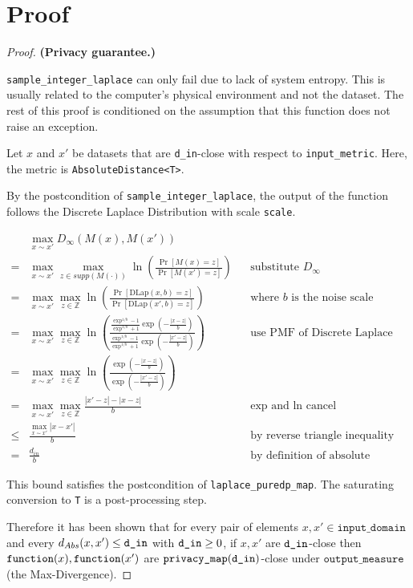 \documentclass{article}
\begin{document}

\section{Proof}

\begin{proof} 
\textbf{(Privacy guarantee.)} 

\texttt{sample\_integer\_laplace} can only fail due to lack of system entropy. 
This is usually related to the computer's physical environment and not the dataset. 
The rest of this proof is conditioned on the assumption that this function does not raise an exception. 

Let $x$ and $x'$ be datasets that are \texttt{d\_in}-close with respect to \texttt{input\_metric}.
Here, the metric is \texttt{AbsoluteDistance<T>}.

By the postcondition of \texttt{sample\_integer\_laplace},
the output of the function follows the Discrete Laplace Distribution with scale \texttt{scale}.

\begin{align*}
    & \max_{x \sim x'} D_{\infty}(M(x), M(x'))  \\
    =& \max_{x \sim x'} \max_{z \in supp(M(\cdot))} \ln\left(\frac{\Pr\left[M(x) = z\right]}{\Pr\left[M(x') = z \right]}\right)
        &&\text{substitute } D_{\infty}\\
    =& \max_{x \sim x'} \max_{z \in \mathbb{Z}} \ln\left(\frac{\Pr\left[\mathrm{DLap}(x, b) = z \right]}{\Pr\left[\mathrm{DLap}(x', b) = z\right]}\right)
        &&\text{where } b \text{ is the noise scale} \\
    =& \max_{x \sim x'} \max_{z \in \mathbb{Z}} \ln\left(\frac{
    \frac{\exp^{1/b} - 1}{\exp^{1/b} + 1} \exp \left( -\frac{|x - z|}{b} \right)
    }{
        \frac{\exp^{1/b} - 1}{\exp^{1/b} + 1} \exp \left( -\frac{|x' - z|}{b} \right)
    }\right) 
        &&\text{use PMF of Discrete Laplace} \\
    =& \max_{x \sim x'} \max_{z \in \mathbb{Z}} \ln\left(\frac{
    \exp \left( -\frac{|x - z|}{b} \right)
    }{
        \exp \left( -\frac{|x' - z|}{b} \right)
    }\right) \\
    =& \max_{x \sim x'} \max_{z \in \mathbb{Z}}\frac{|x' - z| - |x - z|}{b}&& \text{exp and ln cancel} \\
    \leq& \frac{\max_{x \sim x'} |x - x'|}{b} &&\text{by reverse triangle inequality} \\
    =& \frac{d_{in}}{b}  &&\text{by definition of absolute distance}
\end{align*}

This bound satisfies the postcondition of \texttt{laplace\_puredp\_map}.
The saturating conversion to \texttt{T} is a post-processing step.

Therefore it has been shown that for every pair of elements $x, x' \in \texttt{input\_domain}$ and every $d_{Abs}(x, x') \le \texttt{d\_in}$ with $\texttt{d\_in} \ge 0$, 
if $x, x'$ are $\texttt{d\_in}$-close then $\texttt{function}(x),\texttt{function}(x')$ are $\texttt{privacy\_map}(\texttt{d\_in})$-close under $\texttt{output\_measure}$ (the Max-Divergence).
\end{proof}
\end{document}
